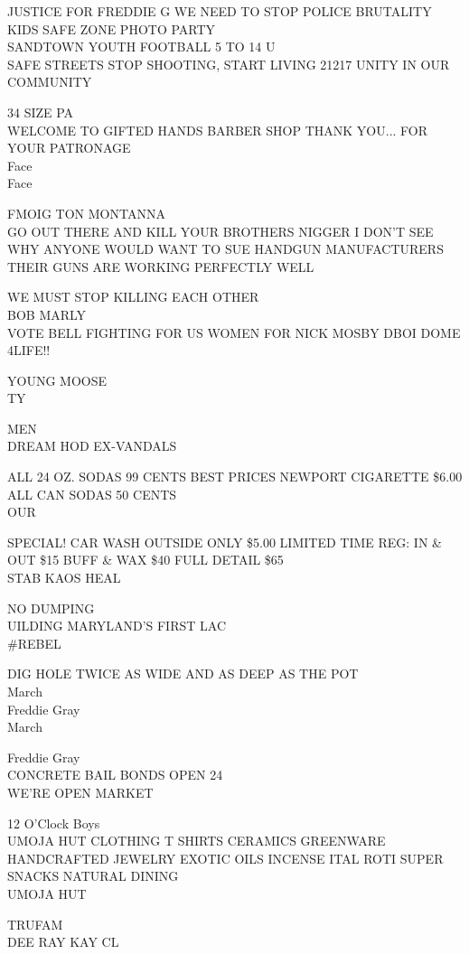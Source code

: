 \documentclass[10pt,letterpaper]{article}
\begin{document}
JUSTICE FOR FREDDIE G WE NEED TO STOP POLICE BRUTALITY\\
KIDS SAFE ZONE PHOTO PARTY\\
SANDTOWN YOUTH FOOTBALL 5 TO 14 U\\
SAFE STREETS STOP SHOOTING, START LIVING 21217 UNITY IN OUR COMMUNITY

34 SIZE PA\\
WELCOME TO GIFTED HANDS BARBER SHOP THANK YOU... FOR YOUR PATRONAGE\\
Face\\
Face

FMOIG TON MONTANNA\\
GO OUT THERE AND KILL YOUR BROTHERS NIGGER I DON'T SEE WHY ANYONE WOULD WANT TO SUE HANDGUN MANUFACTURERS THEIR GUNS ARE WORKING PERFECTLY WELL

WE MUST STOP KILLING EACH OTHER\\
BOB MARLY\\
VOTE BELL FIGHTING FOR US WOMEN FOR NICK MOSBY DBOI DOME\\
4LIFE!!

YOUNG MOOSE\\
TY

MEN\\
DREAM HOD EX{-}VANDALS

ALL 24 OZ. SODAS 99 CENTS BEST PRICES NEWPORT CIGARETTE \$6.00 ALL CAN SODAS 50 CENTS\\
OUR

SPECIAL!  CAR WASH OUTSIDE ONLY \$5.00 LIMITED TIME REG: IN \& OUT \$15 BUFF \& WAX \$40 FULL DETAIL \$65\\
STAB KAOS HEAL

NO DUMPING\\
UILDING MARYLAND'S FIRST LAC\\
\#REBEL

DIG HOLE TWICE AS WIDE AND AS DEEP AS THE POT\\
March\\
Freddie Gray\\
March

Freddie Gray\\
CONCRETE BAIL BONDS OPEN 24\\
WE'RE OPEN MARKET

12 O'Clock Boys\\
UMOJA HUT CLOTHING T SHIRTS CERAMICS GREENWARE HANDCRAFTED JEWELRY EXOTIC OILS INCENSE ITAL ROTI SUPER SNACKS NATURAL DINING\\
UMOJA HUT

TRUFAM\\
DEE RAY KAY CL
\end{document}
